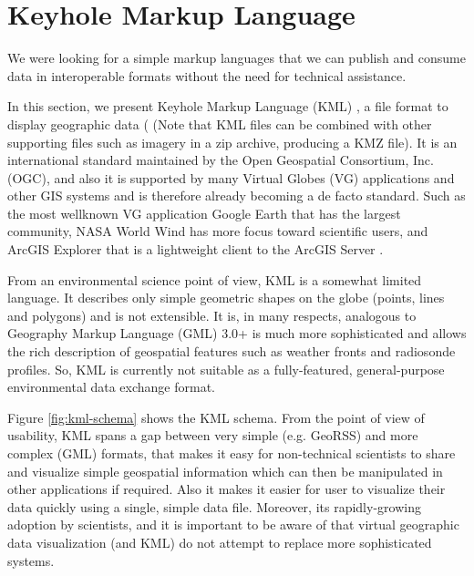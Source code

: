 \section{Keyhole Markup Language}

We were looking for a simple markup languages that we can publish and consume data  in interoperable formats without the need for technical assistance.

In this section, we present Keyhole Markup Language (KML) \parencite{Google.kml.2016}, a file format to display geographic data ( (Note that KML files can be combined with other supporting files such as imagery in a zip archive, producing a KMZ file). It is an international standard maintained by the Open Geospatial Consortium, Inc. (OGC), and also it is supported by many Virtual Globes (VG) applications and other GIS systems and is therefore already becoming a de facto standard. Such as the most wellknown VG application Google Earth that has the largest community, NASA World Wind has more focus toward scientific users, and ArcGIS Explorer that is a lightweight client to the ArcGIS Server \parencite{blower.sharing-visualizing.2007}.

From an environmental science point of view, KML is a somewhat limited language. It describes only simple geometric shapes on the globe (points, lines and polygons) and is not extensible. It is, in many respects, analogous to Geography Markup Language (GML) 3.0+ is much more sophisticated and allows the rich description of geospatial features such as weather fronts and radiosonde profiles. So, KML is currently not suitable as a fully-featured, general-purpose environmental data exchange format.

Figure \ref{fig:kml-schema} shows the KML schema. From the point of view of usability, KML spans a gap between very simple (e.g. GeoRSS) and more complex (GML) formats, that makes it easy for non-technical scientists to share and visualize simple geospatial information which can then be manipulated in other applications if required. Also it makes it easier for user to visualize their data quickly using a single, simple data file. Moreover, its rapidly-growing adoption by scientists, and it is important to be aware of that virtual geographic data visualization (and KML) do not attempt to replace more sophisticated systems. 

